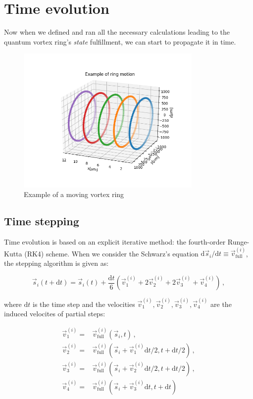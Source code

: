 \newpage

\section{Time evolution}

Now when we defined and ran all the necessary calculations leading to the quantum vortex ring's \textit{state} fulfillment, we can start to propagate it in time.

\begin{figure}[h]
	\centering
	\includegraphics[width=0.8\textwidth]{graphics/simul/time-example}
	\caption{Example of a moving vortex ring}
\end{figure}

\subsection*{Time stepping}

Time evolution is based on an explicit iterative method: the fourth-order Runge-Kutta (RK4) scheme. When we consider the Schwarz's equation $\text{d}\vec{s}_i / \text{d}t \equiv \vec{v}_{\text{full}}^{(i)}$, the stepping algorithm is given as:

\begin{equation}
\vec{s}_{i}(t+\text{d}t) =
\vec{s}_{i}(t) +
\frac{\text{d}t}{6} (\vec{v}_1^{(i)} + 2\vec{v}_2^{(i)} + 2\vec{v}_3^{(i)} + \vec{v}_4^{(i)})\,,
\end{equation}

where $\text{d}t$ is the time step and the velocities $\vec{v}_1^{(i)}, \vec{v}_2^{(i)}, \vec{v}_3^{(i)}, \vec{v}_4^{(i)}$ are the induced velocites of partial steps:

\begin{align}
\vec{v}_1^{(i)} =& \vec{v}_{\text{full}}^{(i)}
(\vec{s}_i, t)\,,
\\
\vec{v}_2^{(i)} =& \vec{v}_{\text{full}}^{(i)}
(\vec{s}_i + \vec{v}_1^{(i)} \text{d}t / 2, t + \text{d}t / 2)\,,
\\
\vec{v}_3^{(i)} =& \vec{v}_{\text{full}}^{(i)}
(\vec{s}_i + \vec{v}_2^{(i)} \text{d}t / 2, t + \text{d}t / 2)\,,
\\
\vec{v}_4^{(i)} =& \vec{v}_{\text{full}}^{(i)}
(\vec{s}_i + \vec{v}_3^{(i)} \text{d}t, t + \text{d}t)
\end{align}

